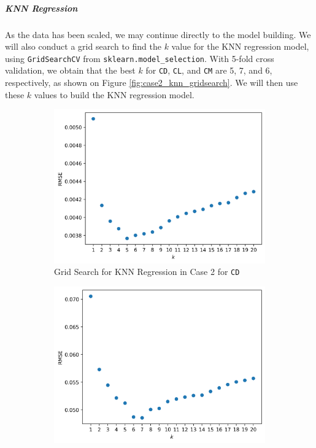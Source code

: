 \documentclass[conf]{new-aiaa}
\begin{document}
\subparagraph{KNN Regression}
As the data has been scaled, we may continue directly to the model building. We will also conduct a grid search to find the $k$ value for the KNN regression model, using \texttt{GridSearchCV} from \texttt{sklearn.model\_selection}. With 5-fold cross validation, we obtain that the best $k$ for \texttt{CD}, \texttt{CL}, and \texttt{CM} are 5, 7, and 6, respectively, as shown on Figure \ref{fig:case2_knn_gridsearch}. We will then use these $k$ values to build the KNN regression model.
\begin{figure}[H]
    \centering
    
    \begin{subfigure}{0.45\textwidth}
        \centering
        \includegraphics[width=1.0\textwidth]{graph/case2_knnr_rmse_cd.png}
        \caption{\label{fig:case2_knn_cd_gridsearch}Grid Search for KNN Regression in Case 2 for \texttt{CD}}
    \end{subfigure}
    \hfill
    \begin{subfigure}{0.45\textwidth}
        \centering
        \includegraphics[width=1.0\textwidth]{graph/case2_knnr_rmse_cl.png}

\end{subfigure}
\end{figure}
\end{document}
